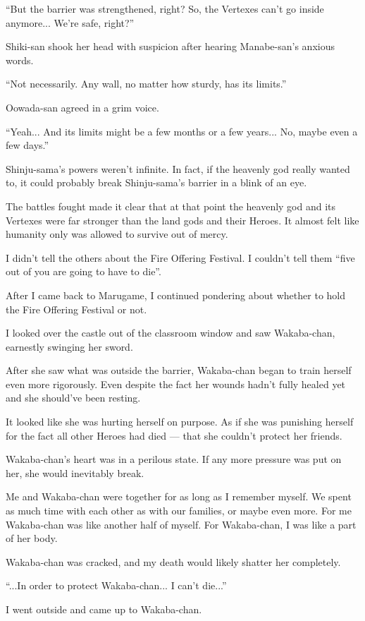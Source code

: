 ``But the barrier was strengthened, right? So, the Vertexes can't go inside anymore... We're safe, right?''

Shiki-san shook her head with suspicion after hearing Manabe-san's anxious words.

``Not necessarily. Any wall, no matter how sturdy, has its limits.''

Oowada-san agreed in a grim voice.

``Yeah... And its limits might be a few months or a few years... No, maybe even a few days.''

Shinju-sama's powers weren't infinite. In fact, if the heavenly god really wanted to, it could probably break Shinju-sama's barrier in a blink of an eye.

The battles fought made it clear that at that point the heavenly god and its Vertexes were far stronger than the land gods and their Heroes. It almost felt like humanity only was allowed to survive out of mercy.

I didn't tell the others about the Fire Offering Festival. I couldn't tell them ``five out of you are going to have to die''.


After I came back to Marugame, I continued pondering about whether to hold the Fire Offering Festival or not.

I looked over the castle out of the classroom window and saw Wakaba-chan, earnestly swinging her sword.

After she saw what was outside the barrier, Wakaba-chan began to train herself even more rigorously. Even despite the fact her wounds hadn't fully healed yet and she should've been resting.

It looked like she was hurting herself on purpose. As if she was punishing herself for the fact all other Heroes had died --- that she couldn't protect her friends.

Wakaba-chan's heart was in a perilous state. If any more pressure was put on her, she would inevitably break.

Me and Wakaba-chan were together for as long as I remember myself. We spent as much time with each other as with our families, or maybe even more. For me Wakaba-chan was like another half of myself. For Wakaba-chan, I was like a part of her body.

Wakaba-chan was cracked, and my death would likely shatter her completely.

``...In order to protect Wakaba-chan... I can't die...''

I went outside and came up to Wakaba-chan.

